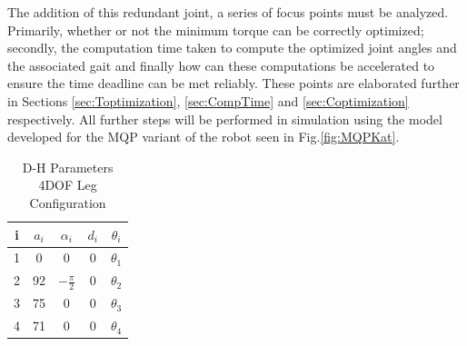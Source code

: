 \documentclass[12pt]{report}
\begin{document}
The addition of this redundant joint, a series of focus points must be analyzed. Primarily, whether or not the minimum torque can be correctly optimized; secondly, the computation time taken to compute the optimized joint angles and the associated gait and finally how can these computations be accelerated to ensure the time deadline can be met reliably. These points are elaborated further in Sections \ref{sec:Toptimization}, \ref{sec:CompTime} and \ref{sec:Coptimization} respectively. All further steps will be performed in simulation using the model developed for the MQP variant of the robot seen in Fig.\ref{fig:MQPKat}.

\begin{table}[H]
\center
\begin{tabular}{|c|c|c|c|c|}
\hline
 i&  $a_i$&  $\alpha_i$&  $d_i$& $\theta_i$ \\
\hline
 1&  0&  0 &  0& $\theta_1 $  \\
 2&  92&  $-\frac{\pi}{2}$ &  0& $\theta_2$ \\
 3&  75&  0&  0& $\theta_3$ \\
 4&  71&  0&  0& $\theta_4$\\
\hline
\end{tabular}
\caption{D-H Parameters 4DOF Leg Configuration}
\label{tab:dh-table-4DOF}
\end{table}
\end{document}

